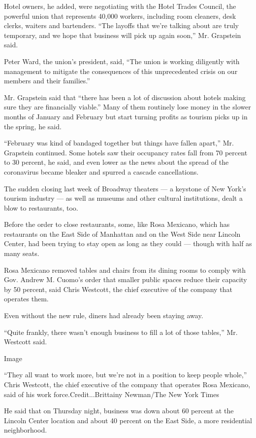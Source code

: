 Hotel owners, he added, were negotiating with the Hotel Trades Council,
the powerful union that represents 40,000 workers, including room
cleaners, desk clerks, waiters and bartenders. ``The layoffs that we're
talking about are truly temporary, and we hope that business will pick
up again soon,'' Mr. Grapstein said.

Peter Ward, the union's president, said, ``The union is working
diligently with management to mitigate the consequences of this
unprecedented crisis on our members and their families.''

Mr. Grapstein said that ``there has been a lot of discussion about
hotels making sure they are financially viable.'' Many of them routinely
lose money in the slower months of January and February but start
turning profits as tourism picks up in the spring, he said.

``February was kind of bandaged together but things have fallen apart,''
Mr. Grapstein continued. Some hotels saw their occupancy rates fall from
70 percent to 30 percent, he said, and even lower as the news about the
spread of the coronavirus became bleaker and spurred a cascade
cancellations.

The sudden closing last week of Broadway theaters --- a keystone of New
York's tourism industry --- as well as museums and other cultural
institutions, dealt a blow to restaurants, too.

Before the order to close restaurants, some, like Rosa Mexicano, which
has restaurants on the East Side of Manhattan and on the West Side near
Lincoln Center, had been trying to stay open as long as they could ---
though with half as many seats.

Rosa Mexicano removed tables and chairs from its dining rooms to comply
with Gov. Andrew M. Cuomo's order that smaller public spaces reduce
their capacity by 50 percent, said Chris Westcott, the chief executive
of the company that operates them.

Even without the new rule, diners had already been staying away.

``Quite frankly, there wasn't enough business to fill a lot of those
tables,'' Mr. Westcott said.

Image

``They all want to work more, but we're not in a position to keep people
whole,'' Chris Westcott, the chief executive of the company that
operates Rosa Mexicano, said of his work force.Credit...Brittainy
Newman/The New York Times

He said that on Thursday night, business was down about 60 percent at
the Lincoln Center location and about 40 percent on the East Side, a
more residential neighborhood.

